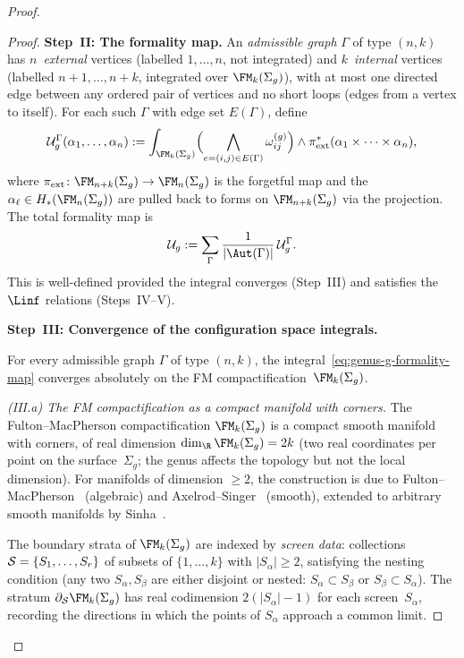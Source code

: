 \begin{proof}
\begin{proof}
\bigskip\noindent
\textbf{Step~II: The formality map.}
An \emph{admissible graph} $\Gamma$ of type $(n,k)$ has
$n$~\emph{external} vertices (labelled $1, \ldots, n$, not
integrated) and $k$~\emph{internal} vertices (labelled
$n+1, \ldots, n+k$, integrated over $\FMg{k}$), with at most
one directed edge between any ordered pair of vertices and no
short loops (edges from a vertex to itself). For each such
$\Gamma$ with edge set $E(\Gamma)$, define
\begin{equation}\label{eq:genus-g-formality-map}
 \cU_g^{\Gamma}(\alpha_1, \ldots, \alpha_n)
 := \int_{\FMg{k}}
 \Bigl(\bigwedge_{e = (i,j) \in E(\Gamma)}
 \omhol_{ij}\Bigr)
 \wedge \pi_{\mathrm{ext}}^\ast
 (\alpha_1 \times \cdots \times \alpha_n),
\end{equation}
where $\pi_{\mathrm{ext}} \colon \FMg{n+k} \to
\FMg{n}$ is the forgetful map and the
$\alpha_\ell \in H_\ast(\FMg{n})$ are pulled back to
forms on $\FMg{n+k}$ via the projection.
The total formality map is
\[
 \cU_g := \sum_{\Gamma}
 \frac{1}{|\Aut(\Gamma)|}\, \cU_g^{\Gamma}.
\]
This is well-defined provided the integral converges
(Step~III) and satisfies the $\Linf$ relations
(Steps~IV--V).

\bigskip\noindent
\textbf{Step~III: Convergence of the configuration space
integrals.}

For every admissible graph $\Gamma$ of type
$(n,k)$, the integral~\eqref{eq:genus-g-formality-map}
converges absolutely on the FM compactification~$\FMg{k}$.

\medskip\noindent
\emph{(III.a) The FM compactification as a compact manifold
with corners.}
The Fulton--MacPherson compactification $\FMg{k}$ is a compact
smooth manifold with corners, of real dimension
$\dim_{\R}\FMg{k} = 2k$ (two real coordinates per point on the
surface~$\Sigma_g$; the genus affects the topology but not the
local dimension). For manifolds of dimension
$\ge 2$, the construction is due to
Fulton--MacPherson~\cite{FM94} (algebraic) and
Axelrod--Singer~\cite{AS94} (smooth), extended to arbitrary
smooth manifolds by Sinha~\cite{Sinha2004}.

The boundary strata of $\FMg{k}$ are indexed by
\emph{screen data}: collections
$\mathcal{S} = \{S_1, \ldots, S_r\}$ of subsets of $\{1, \ldots, k\}$
with $|S_\alpha| \ge 2$, satisfying the nesting condition
(any two $S_\alpha, S_\beta$ are either disjoint or
nested: $S_\alpha \subset S_\beta$ or
$S_\beta \subset S_\alpha$). The stratum
$\partial_{\cS}\FMg{k}$ has real codimension $2(|S_\alpha| - 1)$
for each screen~$S_\alpha$, recording the directions in which
the points of $S_\alpha$ approach a common limit.


\end{proof}
\end{proof}
